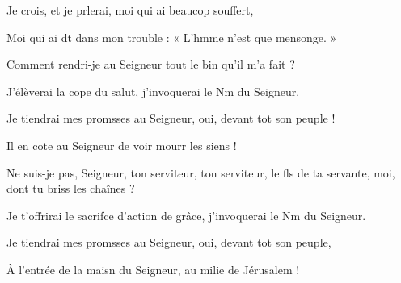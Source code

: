 \item Je crois, et je prlerai,\psstar{} moi qui ai beaucop souffert,
\item Moi qui ai dt dans mon trouble :\psstar{} « L’hmme n’est que mensonge. »
\item Comment rendri-je au Seigneur\psstar{} tout le bin qu’il m’a fait ?
\item J’élèverai la cope du salut,\psstar{} j’invoquerai le Nm du Seigneur.
\item Je tiendrai mes promsses au Seigneur,\psstar{} oui, devant tot son peuple !
\item Il en cote au Seigneur\psstar{} de voir mourr les siens !
\item Ne suis-je pas, Seigneur, ton serviteur,\pscross{} ton serviteur, le fls de ta servante,\psstar{} moi, dont tu briss les chaînes ?
\item Je t’offrirai le sacrifce d’action de grâce,\psstar{} j’invoquerai le Nm du Seigneur.
\item Je tiendrai mes promsses au Seigneur,\psstar{} oui, devant tot son peuple,
\item À l’entrée de la maisn du Seigneur,\psstar{} au milie de Jérusalem !